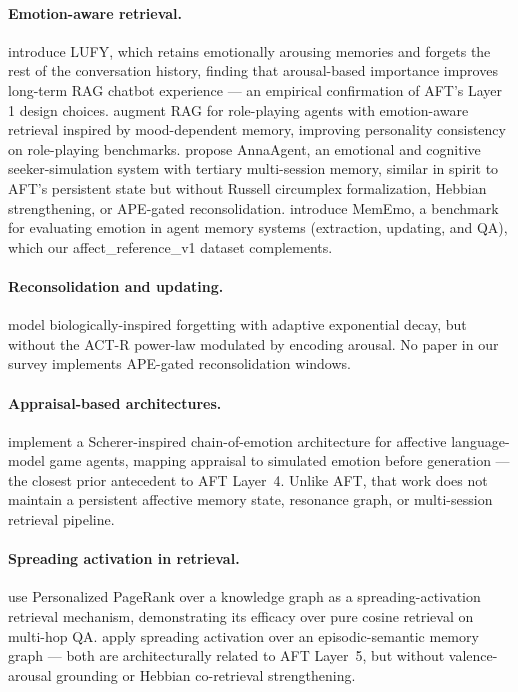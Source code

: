 \documentclass[11pt]{article}
\begin{document}
\paragraph{Emotion-aware retrieval.}
\citet{sumida2024lufy} introduce LUFY, which retains emotionally arousing
memories and forgets the rest of the conversation history, finding that
arousal-based importance improves long-term RAG chatbot experience — an
empirical confirmation of AFT's Layer 1 design choices.
\citet{huang2024emotionalrag} augment RAG for role-playing agents with
emotion-aware retrieval inspired by mood-dependent memory, improving
personality consistency on role-playing benchmarks.
\citet{wang2025anna} propose AnnaAgent, an emotional and cognitive
seeker-simulation system with tertiary multi-session memory, similar in spirit
to AFT's persistent state but without Russell circumplex formalization,
Hebbian strengthening, or APE-gated reconsolidation.
\citet{mememo2026} introduce MemEmo, a benchmark for evaluating emotion in
agent memory systems (extraction, updating, and QA), which our
affect\_reference\_v1 dataset complements.

\paragraph{Reconsolidation and updating.}
\citet{wei2026fademem} model biologically-inspired forgetting with adaptive
exponential decay, but without the ACT-R power-law modulated by encoding
arousal. No paper in our survey implements APE-gated reconsolidation windows.

\paragraph{Appraisal-based architectures.}
\citet{croissant2024chain} implement a Scherer-inspired chain-of-emotion
architecture for affective language-model game agents, mapping appraisal to
simulated emotion before generation — the closest prior antecedent to
AFT Layer~4. Unlike AFT, that work does not maintain a persistent affective
memory state, resonance graph, or multi-session retrieval pipeline.

\paragraph{Spreading activation in retrieval.}
\citet{gutierrez2024hipporag} use Personalized PageRank over a knowledge graph
as a spreading-activation retrieval mechanism, demonstrating its efficacy over
pure cosine retrieval on multi-hop QA.
\citet{jiang2026synapse} apply spreading activation over an episodic-semantic
memory graph — both are architecturally related to AFT Layer~5, but without
valence-arousal grounding or Hebbian co-retrieval strengthening.
\end{document}
